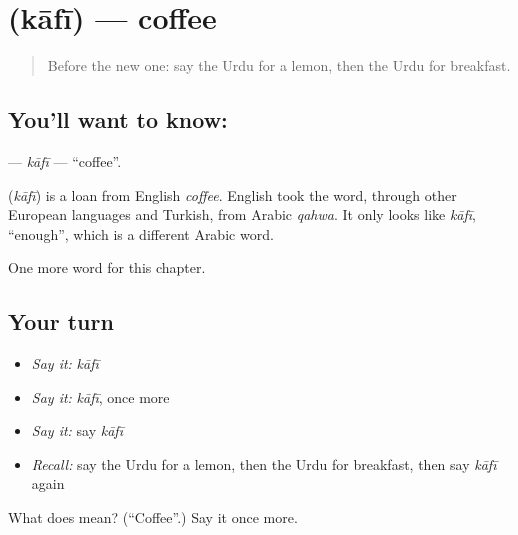 \section[\texorpdfstring{\ur{کافی} (kāfī)}{کافی (kāfī)}]{ (kāfī) — coffee}

\label{lesson:UR-C57-kafi}



\begin{quote}
Before the new one: say the Urdu for a lemon, then the Urdu for breakfast.
\end{quote}

\subsection*{You'll want to know: }
\textbf{} — \emph{kāfī} — \textquotedblleft{}coffee\textquotedblright{}.

\begin{cousinweb}
\textbf{} (\emph{kāfī}) is a loan from English \emph{coffee}. English took the word, through other European languages and Turkish, from Arabic \emph{qahwa}. It only looks like \emph{kāfī}, \textquotedblleft{}enough\textquotedblright{}, which is a different Arabic word.
\end{cousinweb}

\begin{grammarlens}[title={What you've built}]
One more word for this chapter.
\end{grammarlens}

\subsection*{Your turn}
\begin{itemize}
\raggedright
  \item \emph{Say it:} \emph{kāfī}
  \item \emph{Say it:} \emph{kāfī}, once more
  \item \emph{Say it:} say \emph{kāfī}
  \item \emph{Recall:} say the Urdu for a lemon, then the Urdu for breakfast, then say \emph{kāfī} again
\end{itemize}

\begin{tcolorbox}[breakable,colback=teal!4,colframe=teal!35!black,title={Before you move on}]
What does  mean? (\textquotedblleft{}Coffee\textquotedblright{}.) Say it once more.
\end{tcolorbox}
